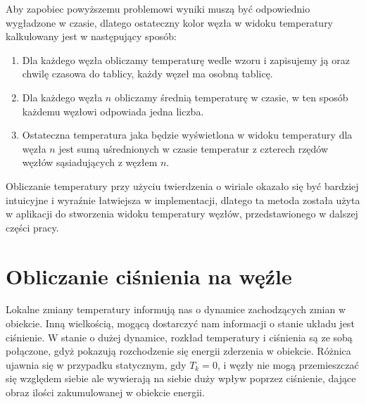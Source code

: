 \documentclass[12pt, letterpaper]{report}
\begin{document}
    Aby zapobiec powyższemu problemowi wyniki muszą być odpowiednio wygładzone w czasie, dlatego
    ostateczny kolor węzła w widoku temperatury kalkulowany jest w następujący sposób:
    \begin{enumerate}
        \item Dla każdego węzła obliczamy temperaturę wedle wzoru i zapisujemy ją 
        oraz chwilę czasowa do tablicy, każdy węzeł ma osobną tablicę.
        \item Dla każdego węzła $n$ obliczamy średnią temperaturę w czasie, w ten sposób każdemu węzłowi
        odpowiada jedna liczba.
        \item Ostateczna temperatura jaka będzie wyświetlona w widoku temperatury dla węzła $n$
        jest sumą uśrednionych w czasie temperatur z czterech rzędów węzłów sąsiadujących z
        węzłem $n$.
    \end{enumerate}


    Obliczanie temperatury przy użyciu twierdzenia o wiriale okazało się być bardziej intuicyjne i
    wyraźnie łatwiejsza w implementacji, dlatego ta metoda została użyta w aplikacji do stworzenia widoku 
    temperatury węzłów, przedstawionego w dalszej części pracy.
    
    \clearpage
    \section{Obliczanie ciśnienia na węźle}
    Lokalne zmiany temperatury informują nas o dynamice zachodzących zmian w obiekcie.
    Inną wielkością, mogącą dostarczyć nam informacji o stanie układu jest ciśnienie.
    W stanie o dużej dynamice, rozkład temperatury i ciśnienia są ze sobą połączone, gdyż 
    pokazują rozchodzenie się energii zderzenia w obiekcie. Różnica ujawnia się w przypadku statycznym,
    gdy $T_k = 0$, i węzły nie mogą przemieszczać się względem siebie ale wywierają na siebie duży wpływ poprzez 
    ciśnienie, dające obraz ilości zakumulowanej w obiekcie energii.
\end{document}
